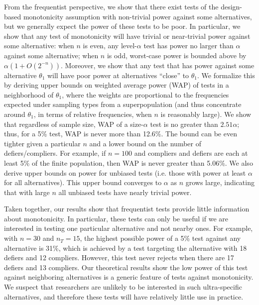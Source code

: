 \documentclass[12pt,reqno]{amsart}
\theoremstyle{theorem}
\theoremstyle{definition}
\newcommand{\0}{\mathbf{0}}
\newcommand{\1}{\mathbf{1}}
\begin{document}
From the frequentist perspective, we show that there exist tests of the design-based
monotonicity assumption with non-trivial power against some alternatives, but we
generally expect the power of these tests to be poor. In particular, we show that any test of monotonicity will have trivial or near-trivial power against some alternative: when $n$ is even, any level-$\alpha$ test has power no larger than $\alpha$ against some alternative; when $n$ is odd, worst-case power is bounded above by $\alpha (1 + O(2^{-n}))$. Moreover, we show
that any test that has power against some alternative $\theta_1$ will have poor power at
alternatives ``close'' to $\theta_1$. We formalize this by deriving upper bounds on weighted average power (WAP) of tests in a neighborhood of $\theta_1$, where the weights
are proportional to the frequencies expected under sampling types from a superpopulation (and
thus concentrate around $\theta_1$, in terms of relative frequencies, when $n$ is
reasonably large). We show that regardless of sample size, WAP of a size-$\alpha$
test
is no greater than $2.51 \alpha$; thus, for a 5\% test, WAP is never more than
12.6\%. The
bound can be even tighter given a particular $n$ and a lower bound on the number of
defiers/compliers. For example, if $n=100$ and compliers and defiers are each at least
5\% of the finite population, then WAP is never greater than 5.06\%. We also derive upper bounds on power for unbiased tests (i.e. those with power at least $\alpha$ for all alternatives). This upper bound converges to $\alpha$ as $n$ grows large, indicating that with large $n$ all unbiased tests have nearly trivial power. 

Taken together, our results show that frequentist tests provide little information about monotonicity.
In particular, these tests can only be useful if we are interested in testing one particular alternative and not
nearby ones. For example, with $n=30$ and $n_T=15$, the highest possible power of a 5\% test against any alternative is 31\%, which is achieved by a test targeting the alternative with 18 defiers and 12 compliers. However, this test never rejects when there are 17 defiers and 13 compliers. Our theoretical results show the low power of this test against neighboring alternatives is a generic feature of tests against monotonicity. We suspect that researchers are unlikely to be interested in such ultra-specific alternatives, and therefore these tests will
have relatively little use in practice. 
\end{document}
